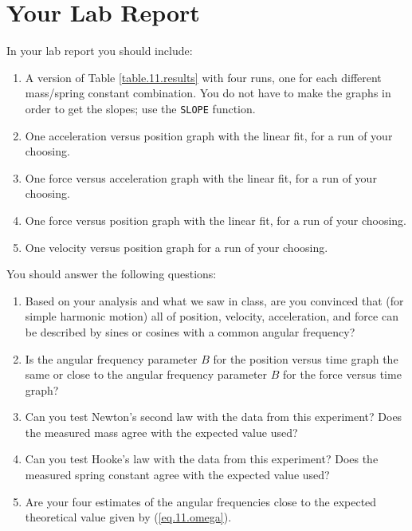 \section{Your Lab Report}
In your lab report you should include:
\begin{enumerate}
    \item A version of Table \ref{table.11.results} with four runs, one for each different mass/spring constant combination. You do not have to make the graphs in order to get the slopes; use the \texttt{SLOPE} function.
    \item One acceleration versus position graph with the linear fit, for a run of your choosing.
    \item One force versus acceleration graph with the linear fit, for a run of your choosing.
    \item One force versus position graph with the linear fit, for a run of your choosing.
    \item One velocity versus position graph for a run of your choosing.
\end{enumerate}
You should answer the following questions:
\begin{enumerate}
    \item Based on your analysis and what we saw in class, are you convinced that (for simple harmonic motion) all of position, velocity, acceleration, and force can be described by sines or cosines with a common angular frequency?
    \item Is the angular frequency parameter $B$ for the position versus time graph the same or close to the angular frequency parameter $B$ for the force versus time graph?
    \item Can you test Newton's second law with the data from this experiment? Does the measured mass agree with the expected value used?
    \item Can you test Hooke's law with the data from this experiment? Does the measured spring constant agree with the expected value used?
    \item Are your four estimates of the angular frequencies close to the expected theoretical value given by (\ref{eq.11.omega}).
\end{enumerate}